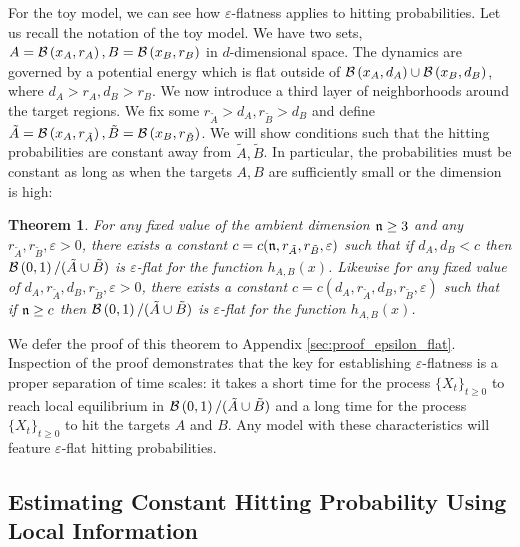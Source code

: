 \documentclass[english, aip, jcp, priprint, graphicx,floatfix]{revtex4-1}
\newtheorem{theorem}{Theorem}
\theoremstyle{plain}
\theoremstyle{definition}
\theoremstyle{plain}
\begin{document}
For the toy model, we can see how  $\varepsilon$-flatness applies to hitting probabilities.  Let us recall the notation of the toy model.  We have two sets, $A=\mathcal{B}\left(x_A,r_A\right),B=\mathcal{B}\left(x_B,r_B\right)$ in $d$-dimensional space.  The dynamics are governed by a potential energy which is flat outside of $\mathcal{B}\left(x_A,d_A\right)\cup\mathcal{B}\left(x_B,d_B\right)$, where $d_A>r_A,d_B>r_B$.  We now introduce a third layer of neighborhoods around the target regions.  We fix some $r_{\tilde A}>d_A,r_{\tilde B}>d_B$ and define $\tilde A=\mathcal{B}\left(x_A,r_{\tilde A}\right),\tilde B=\mathcal{B}\left(x_B,r_{\tilde B}\right)$.  We will show conditions such that the hitting probabilities are constant away from $\tilde A,\tilde B$.  In particular, the probabilities must be constant as long as when the targets $A, B$ are sufficiently small or the dimension is high:

\begin{theorem}\label{thm:epsilon_flat}
For any fixed value of the ambient dimension ${\mathfrak{n}} \geq 3$ and any $r_{\tilde{A}}, r_{\tilde{B}}, \varepsilon > 0$, there exists a constant $c=c({\mathfrak{n}}, r_{\tilde{A}}, r_{\tilde{B}}, \varepsilon)$ such that if $d_{A}, d_{B} < c$ then $\mathcal{B}\left(0, 1\right) / (\tilde{A} \cup \tilde{B})$ is $\varepsilon$-flat for the function $h_{A,B}(x)$.  Likewise for any fixed value of $d_{A}, r_{\tilde{A}}, d_{B}, r_{\tilde{B}}, \varepsilon>0$, there exists a constant $c=c(d_{A}, r_{\tilde{A}}, d_{B}, r_{\tilde{B}}, \varepsilon)$ such that if ${\mathfrak{n}} \geq c$ then $\mathcal{B}\left(0, 1\right) / (\tilde{A} \cup \tilde{B})$ is $\varepsilon$-flat for the function $h_{A,B}(x)$.
\end{theorem}

We defer the proof of this theorem to Appendix \ref{sec:proof_epsilon_flat}. Inspection of the proof demonstrates that the key for establishing $\varepsilon$-flatness is a proper separation of time scales: it takes a short time for the process $\{X_t\}_{t\geq 0}$ to reach local equilibrium in $\mathcal{B}\left(0, 1\right) / (\tilde{A} \cup \tilde{B})$ and a long time for the process $\{X_t\}_{t\geq 0}$ to hit the targets $A$ and $B$.  Any model with these characteristics will feature $\varepsilon$-flat hitting probabilities.

\subsection{Estimating Constant Hitting Probability Using Local Information}
\end{document}

